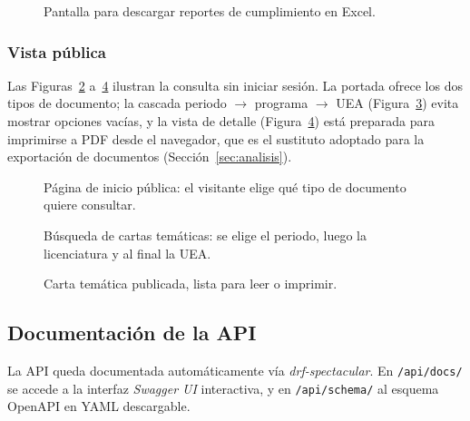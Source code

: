 \begin{figure}[!htbp]
    \centering
    \caption{Pantalla para descargar reportes de cumplimiento en Excel.}
    \label{fig:admin_reportes}
\end{figure}

\subsubsection{Vista pública}

Las Figuras~\ref{fig:publico_home} a~\ref{fig:publico_carta} ilustran la consulta sin iniciar sesión. La portada ofrece los dos tipos de documento; la cascada periodo $\rightarrow$ programa $\rightarrow$ UEA (Figura~\ref{fig:publico_explorar}) evita mostrar opciones vacías, y la vista de detalle (Figura~\ref{fig:publico_carta}) está preparada para imprimirse a PDF desde el navegador, que es el sustituto adoptado para la exportación de documentos (Sección~\ref{sec:analisis}).

\begin{figure}[!htbp]
    \centering
    \caption{Página de inicio pública: el visitante elige qué tipo de documento quiere consultar.}
    \label{fig:publico_home}
\end{figure}

\begin{figure}[!htbp]
    \centering
    \caption{Búsqueda de cartas temáticas: se elige el periodo, luego la licenciatura y al final la UEA.}
    \label{fig:publico_explorar}
\end{figure}

\begin{figure}[!htbp]
    \centering
    \caption{Carta temática publicada, lista para leer o imprimir.}
    \label{fig:publico_carta}
\end{figure}

\subsection{Documentación de la API}

La API queda documentada automáticamente vía \emph{drf-spectacular}. En \texttt{/api/docs/} se accede a la interfaz \emph{Swagger UI} interactiva, y en \texttt{/api/schema/} al esquema OpenAPI en YAML descargable.

\newpage
